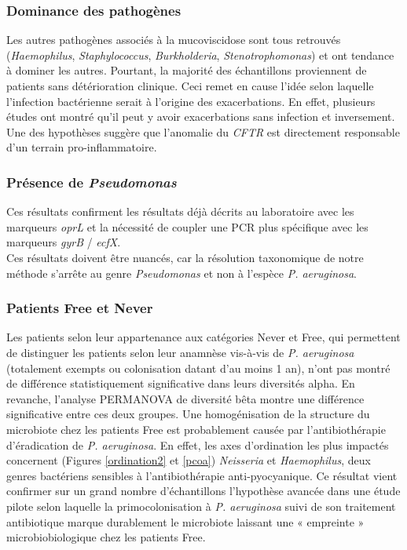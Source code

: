 \documentclass[12pt,a4paper]{article}
\begin{document}
\subsubsection{Dominance des pathogènes}
Les autres pathogènes associés à la mucoviscidose sont tous retrouvés (\textit{Haemophilus}, \textit{Staphylococcus}, \textit{Burkholderia}, \textit{Stenotrophomonas}) et ont tendance à dominer les autres. Pourtant, la majorité des échantillons proviennent de patients sans détérioration clinique. Ceci remet en cause l'idée selon laquelle l'infection bactérienne serait à l'origine des exacerbations. En effet, plusieurs études \cite{Tirouvanziam2000,Heijerman2005} ont montré qu'il peut y avoir exacerbations sans infection et inversement. Une des hypothèses suggère que l'anomalie du \textit{CFTR} est directement responsable d'un terrain pro-inflammatoire.

\subsubsection{Présence de \textit{Pseudomonas}}

Ces résultats confirment les résultats déjà décrits au laboratoire \cite{LeGall} avec les marqueurs \textit{oprL} et la nécessité de coupler une PCR plus spécifique avec les marqueurs \textit{gyrB} / \textit{ecfX}. \\
Ces résultats doivent être nuancés, car la résolution taxonomique de notre méthode s'arrête au genre \textit{Pseudomonas} et non à l'espèce \textit{P. aeruginosa}.

\subsubsection{Patients Free et Never}
Les patients selon leur appartenance aux catégories Never et Free\cite{Lee2003}, qui permettent de distinguer les patients selon leur anamnèse vis-à-vis de \textit{P. aeruginosa} (totalement exempts ou colonisation datant d'au moins 1 an), n'ont pas montré de différence statistiquement significative dans leurs diversités alpha. En revanche, l'analyse PERMANOVA de diversité bêta montre une différence significative entre ces deux groupes. Une homogénisation de la structure du microbiote chez les patients Free est probablement causée par l'antibiothérapie d'éradication de \textit{P. aeruginosa}. En effet, les axes d'ordination les plus impactés concernent (Figures \ref{ordination2} et \ref{pcoa}) \textit{Neisseria} et \textit{Haemophilus}, deux genres bactériens sensibles à l'antibiothérapie anti-pyocyanique. Ce résultat vient confirmer sur un grand nombre d'échantillons l'hypothèse avancée dans une étude pilote \cite{Keravec2015} selon laquelle la primocolonisation à \textit{P. aeruginosa} suivi de son traitement antibiotique marque durablement le microbiote laissant une « empreinte » microbiobiologique chez les patients Free.
\end{document}
